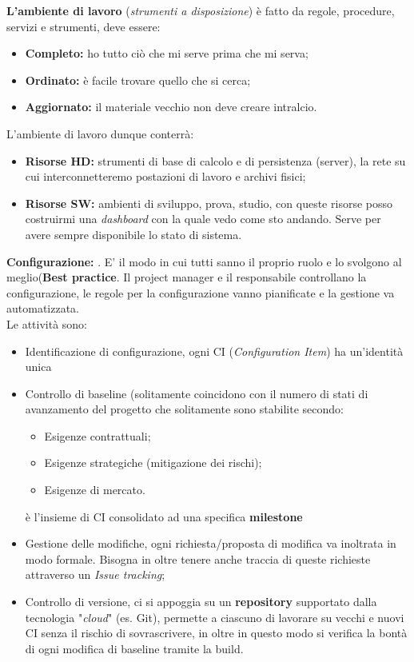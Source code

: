 \textbf{L'ambiente di lavoro} (\textit{strumenti a disposizione}) è fatto da regole, procedure, servizi e strumenti, deve essere:
\begin{itemize}
	\item \textbf{Completo:} ho tutto ciò che mi serve prima che mi serva;
	\item \textbf{Ordinato:} è facile trovare quello che si cerca;
	\item \textbf{Aggiornato:} il materiale vecchio non deve creare intralcio.
\end{itemize}
L'ambiente di lavoro dunque conterrà:
\begin{itemize}
	\item \textbf{Risorse HD:} strumenti di base di calcolo e di persistenza (server), la rete su cui interconnetteremo postazioni di lavoro e archivi fisici;
	\item \textbf{Risorse SW:} ambienti di sviluppo, prova, studio, con queste risorse posso costruirmi una \textit{dashboard} con la quale vedo come sto andando. Serve per avere sempre disponibile lo stato di sistema.
\end{itemize}

\textbf{Configurazione:} . E' il modo in cui tutti sanno il proprio ruolo e lo svolgono al meglio(\textbf{Best practice}. Il project manager e il responsabile controllano la configurazione, le regole per la configurazione vanno pianificate e la gestione va automatizzata.\\
Le attività sono:
\begin{itemize}
	\item Identificazione di configurazione, ogni CI (\textit{Configuration Item}) ha un'identità unica
	\item Controllo di baseline  (solitamente coincidono con il numero di stati di avanzamento del progetto che solitamente sono stabilite secondo:\begin{itemize}
		\item Esigenze contrattuali;
		\item Esigenze strategiche (mitigazione dei rischi);
		\item Esigenze di mercato.
	\end{itemize} è l'insieme di CI consolidato ad una specifica \textbf{milestone}
	\item Gestione delle modifiche, ogni richiesta/proposta di modifica va inoltrata in modo formale. Bisogna in oltre tenere anche traccia di queste richieste attraverso un \textit{Issue tracking};
	\item Controllo di versione, ci si appoggia su un \textbf{repository} supportato dalla tecnologia "\textit{cloud}" (es. Git), permette a ciascuno di lavorare su vecchi e nuovi CI senza il rischio di sovrascrivere, in oltre in questo modo si verifica la bontà di ogni modifica di baseline tramite la build.
\end{itemize}

